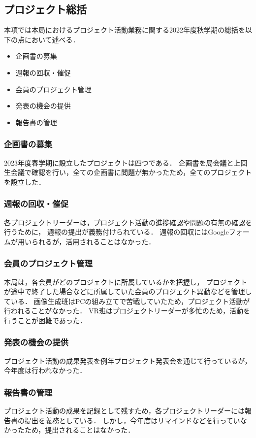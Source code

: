 \subsection*{プロジェクト総括}


本項では本局におけるプロジェクト活動業務に関する2022年度秋学期の総括を以下の点において述べる．

\begin{itemize}
  \item 企画書の募集
  \item 週報の回収・催促
  \item 会員のプロジェクト管理
  \item 発表の機会の提供
  \item 報告書の管理
\end{itemize}

\subsubsection*{企画書の募集}

2023年度春学期に設立したプロジェクトは四つである．
企画書を局会議と上回生会議で確認を行い，全ての企画書に問題が無かったため，全てのプロジェクトを設立した．

\subsubsection*{週報の回収・催促}

各プロジェクトリーダーは，プロジェクト活動の進捗確認や問題の有無の確認を行うために，
週報の提出が義務付けられている．
週報の回収にはGoogleフォームが用いられるが，活用されることはなかった．

\subsubsection*{会員のプロジェクト管理}

本局は，各会員がどのプロジェクトに所属しているかを把握し，
プロジェクトが途中で終了した場合などに所属していた会員のプロジェクト異動などを管理している．
画像生成班はPCの組み立てで苦戦していたため，プロジェクト活動が行われることがなかった．
VR班はプロジェクトリーダーが多忙のため，活動を行うことが困難であった．
\subsubsection*{発表の機会の提供}

プロジェクト活動の成果発表を例年プロジェクト発表会を通じて行っているが，今年度は行われなかった．

\subsubsection*{報告書の管理}

プロジェクト活動の成果を記録として残すため，各プロジェクトリーダーには報告書の提出を義務としている．
しかし，今年度はリマインドなどを行っていなかったため，提出されることはなかった．
